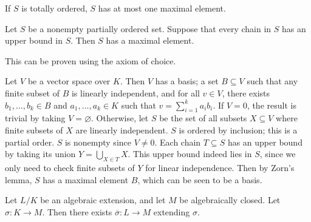 If \( S \) is totally ordered, \( S \) has at most one maximal element.
\begin{lemma}[Zorn]
	Let \( S \) be a nonempty partially ordered set.
	Suppose that every chain in \( S \) has an upper bound in \( S \).
	Then \( S \) has a maximal element.
\end{lemma}
This can be proven using the axiom of choice.
\begin{example}
	Let \( V \) be a vector space over \( K \).
	Then \( V \) has a basis; a set \( B \subseteq V \) such that any finite subset of \( B \) is linearly independent, and for all \( v \in V \), there exists \( b_1, \dots, b_k \in B \) and \( a_1, \dots, a_k \in K \) such that \( v = \sum_{i=1}^k a_i b_i \).
	If \( V = \qty{0} \), the result is trivial by taking \( V = \varnothing \).
	Otherwise, let \( S \) be the set of all subsets \( X \subseteq V \) where finite subsets of \( X \) are linearly independent.
	\( S \) is ordered by inclusion; this is a partial order.
	\( S \) is nonempty since \( V \neq \qty{0} \).
	Each chain \( T \subseteq S \) has an upper bound by taking its union \( Y = \bigcup_{X \in T} X \).
	This upper bound indeed lies in \( S \), since we only need to check finite subsets of \( Y \) for linear independence.
	Then by Zorn's lemma, \( S \) has a maximal element \( B \), which can be seen to be a basis.
\end{example}
\begin{proposition}
	Let \( L / K \) be an algebraic extension, and let \( M \) be algebraically closed.
	Let \( \sigma \colon K \to M \).
	Then there exists \( \overline \sigma \colon L \to M \) extending \( \sigma \).
\end{proposition}
